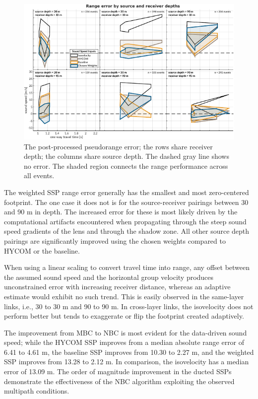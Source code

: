 \begin{figure}[!ht]
\includegraphics[width=\textwidth]{figs/range-error-allMethods.pdf}
\caption{The post-processed pseudorange error; the rows share receiver depth; the columns share source depth. The dashed gray line shows no error. The shaded region connects the range performance across all events.}
\label{fig:rangeError}
\end{figure}

The weighted SSP range error generally has the smallest and most zero-centered footprint.
The one case it does not is for the source-receiver pairings between 30 and 90 m in depth.
The increased error for these is most likely driven by the computational artifacts encountered when propagating through the steep sound speed gradients of the lens and through the shadow zone.
All other source depth pairings are significantly improved using the chosen weights compared to HYCOM or the baseline.

When using a linear scaling to convert travel time into range, any offset between the assumed sound speed and the horizontal group velocity produces unconstrained error with increasing receiver distance, whereas an adaptive estimate would exhibit no such trend.
This is easily observed in the same-layer links, i.e., 30 to 30 m and 90 to 90 m.
In cross-layer links, the isovelocity does not perform better but tends to exaggerate or flip the footprint created adaptively.

The improvement from MBC to NBC is most evident for the data-driven sound speed; while the HYCOM SSP improves from a median absolute range error of 6.41 to 4.61 m, the baseline SSP improves from 10.30 to 2.27 m, and the weighted SSP improves from 13.28 to 2.12 m.
In comparison, the isovelocity has a median error of 13.09 m.
The order of magnitude improvement in the ducted SSPs demonstrate the effectiveness of the NBC algorithm exploiting the observed multipath conditions.

